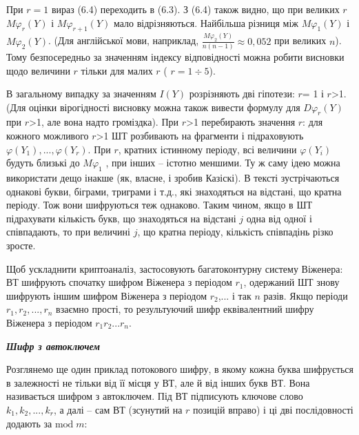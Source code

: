 \documentclass[a4paper]{article}
\newcounter{}
\begin{document}
При  ${r=1}$ вираз (6.4) переходить в (6.3). З (6.4) також видно, що при великих
 ${r}$  ${\mathit{M\varphi }_{{r}}(Y)}$ і  ${\mathit{M\varphi }_{{r+1}}(Y)}$
мало відрізняються. Найбільша різниця між  ${\mathit{M\varphi }_{{1}}(Y)}$ і 
${\mathit{M\varphi }_{{2}}(Y)}$. (Для англійської мови, наприклад, 
${\frac{\mathit{M\varphi }_{{2}}(Y)}{n(n-1)}\approx 0,\text{052}}$ при великих 
${n}$). Тому безпосередньо за значенням індексу відповідності можна робити
висновки щодо величини  ${r}$ тільки для малих  ${r}$ ( ${r=1\div 5}$). 

В загальному випадку за значенням  ${I(Y)}$ розрізняють дві гіпотези:  ${r}$= 1
і  ${r}${\textgreater}1. (Для оцінки вірогідності висновку можна також вивести
формулу для  ${\mathit{D\varphi }_{{r}}(Y)}$ при  ${r}${\textgreater}1, але
вона надто громіздка). При  ${r}${\textgreater}1 перебирають значення  ${r}$:
для кожного можливого  ${r}${\textgreater}1 ШТ розбивають на фрагменти і
підраховують  ${\varphi (Y_{{1}}),\text{.}\text{.}\text{.},\varphi (Y_{{r}})}$.
При  ${r}$, кратних істинному періоду, всі величини  ${\varphi (Y_{{i}})}$
будуть близькі до  ${\mathit{M\varphi }_{{1}}}$ , при інших – істотно меншими.
Ту ж саму ідею можна використати дещо інакше (як, власне, і зробив Казіскі). В
тексті зустрічаються однакові букви, біграми, триграми і т.д., які знаходяться
на відстані, що кратна періоду. Тож вони шифруються теж однаково. Таким чином,
якщо в ШТ підрахувати кількість букв, що знаходяться на відстані  ${j}$ одна
від одної і співпадають, то при величині  ${j}$, що кратна періоду, кількість
співпадінь різко зросте.

Щоб ускладнити криптоаналіз, застосовують багатоконтурну систему Віженера: ВТ
шифрують спочатку шифром Віженера з періодом  ${r_{{1}}}$, одержаний ШТ знову
шифрують іншим шифром Віженера з періодом  ${r_{{2}}}$,... і так  ${n}$ разів.
Якщо періоди  ${r_{{1}},r_{{2}},\text{.}\text{.}\text{.},r_{{n}}}$ взаємно
прості, то результуючий шифр еквівалентний шифру Віженера з періодом 
${r_{{1}}r_{{2}}\text{.}\text{.}\text{.}r_{{n}}}$. 


\bigskip


\bigskip

{\centering\bfseries\itshape
Шифр з автоключем
\par}


\bigskip


\bigskip

Розглянемо ще один приклад потокового шифру, в якому кожна буква шифрується в
залежності не тільки від її місця у ВТ, але й від інших букв ВТ. Вона
називається шифром з автоключем. Під ВТ підписують ключове слово 
${k_{{1}},k_{{2}},\text{.}\text{.}\text{.},k_{{r}}}$, а далі – сам ВТ (зсунутий
на  ${r}$ позицій вправо) і ці дві послідовності додають за  ${\text{mod}\;m}$:
\end{document}

